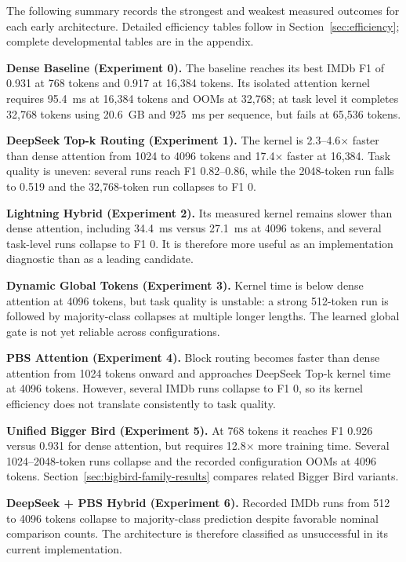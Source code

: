 \documentclass[11pt]{article}
\begin{document}
The following summary records the strongest and weakest measured outcomes for
each early architecture. Detailed efficiency tables follow in
Section~\ref{sec:efficiency}; complete developmental tables are in the
appendix.

\textbf{Dense Baseline (Experiment 0).} The baseline reaches its best IMDb F1
of 0.931 at 768 tokens and 0.917 at 16{,}384 tokens. Its isolated attention
kernel requires 95.4~ms at 16{,}384 tokens and OOMs at 32{,}768; at task level
it completes 32{,}768 tokens using 20.6~GB and 925~ms per sequence, but fails
at 65{,}536 tokens.

\textbf{DeepSeek Top-k Routing (Experiment 1).} The kernel is
2.3--4.6$\times$ faster than dense attention from 1024 to 4096 tokens and
17.4$\times$ faster at 16{,}384. Task quality is uneven: several runs reach
F1 0.82--0.86, while the 2048-token run falls to 0.519 and the 32{,}768-token
run collapses to F1 0.

\textbf{Lightning Hybrid (Experiment 2).} Its measured kernel remains slower
than dense attention, including 34.4~ms versus 27.1~ms at 4096 tokens, and
several task-level runs collapse to F1 0. It is therefore more useful as an
implementation diagnostic than as a leading candidate.

\textbf{Dynamic Global Tokens (Experiment 3).} Kernel time is below dense
attention at 4096 tokens, but task quality is unstable: a strong 512-token run
is followed by majority-class collapses at multiple longer lengths. The
learned global gate is not yet reliable across configurations.

\textbf{PBS Attention (Experiment 4).} Block routing becomes faster than
dense attention from 1024 tokens onward and approaches DeepSeek Top-k kernel
time at 4096 tokens. However, several IMDb runs collapse to F1 0, so its
kernel efficiency does not translate consistently to task quality.

\textbf{Unified Bigger Bird (Experiment 5).} At 768 tokens it reaches F1
0.926 versus 0.931 for dense attention, but requires 12.8$\times$ more
training time. Several 1024--2048-token runs collapse and the recorded
configuration OOMs at 4096 tokens. Section~\ref{sec:bigbird-family-results}
compares related Bigger Bird variants.

\textbf{DeepSeek + PBS Hybrid (Experiment 6).} Recorded IMDb runs from 512 to
4096 tokens collapse to majority-class prediction despite favorable nominal
comparison counts. The architecture is therefore classified as unsuccessful
in its current implementation.
\end{document}
